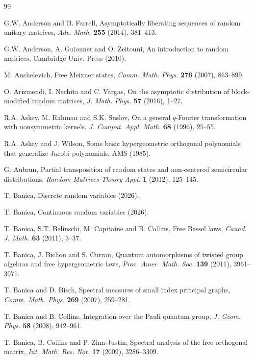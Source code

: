 \documentclass[12pt]{amsbook}
\begin{document}
\begin{thebibliography}{99}

\baselineskip=12.4pt

G.W. Anderson and B. Farrell, Asymptotically liberating sequences of random unitary matrices, {\em Adv. Math.} {\bf 255} (2014), 381--413.

G.W. Anderson, A. Guionnet and O. Zeitouni, An introduction to random matrices, Cambridge Univ. Press (2010).

M. Anshelevich, Free Meixner states, {\em Comm. Math. Phys.} {\bf 276} (2007), 863--899.

O. Arizmendi, I. Nechita and C. Vargas, On the asymptotic distribution of block-modified random matrices, {\em J. Math. Phys.} {\bf 57} (2016), 1--27.

R.A. Askey, M. Rahman and S.K. Suslov, On a general $q$-Fourier transformation with nonsymmetric kernels, {\em J. Comput. Appl. Math.} {\bf 68} (1996), 25--55.

R.A. Askey and J. Wilson, Some basic hypergeometric orthogonal polynomials that generalize Jacobi polynomials, AMS (1985).

G. Aubrun, Partial transposition of random states and non-centered semicircular distributions, {\em Random Matrices Theory Appl.} {\bf 1} (2012), 125--145.

T. Banica, Discrete random variables (2026).

T. Banica, Continuous random variables (2026).

T. Banica, S.T. Belinschi, M. Capitaine and B. Collins, Free Bessel laws, {\em Canad. J. Math.} {\bf 63} (2011), 3--37.

T. Banica, J. Bichon and S. Curran, Quantum automorphisms of twisted group algebras and free hypergeometric laws, {\em Proc. Amer. Math. Soc.} {\bf 139} (2011), 3961--3971.

T. Banica and D. Bisch, Spectral measures of small index principal graphs, {\em Comm. Math. Phys.} {\bf 269} (2007), 259--281.

T. Banica and B. Collins, Integration over the Pauli quantum group, {\em J. Geom. Phys.} {\bf 58} (2008), 942--961.

T. Banica, B. Collins and P. Zinn-Justin, Spectral analysis of the free orthogonal matrix, {\em Int. Math. Res. Not.} {\bf 17} (2009), 3286--3309.


\end{thebibliography}
\end{document}
